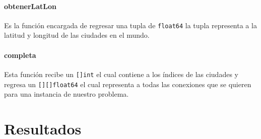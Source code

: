 \documentclass[
10pt,
a4paper,
oneside,
headinclude,footinclude,
BCOR5mm,
]{article}
\begin{document}
\paragraph{obtenerLatLon} Es la función encargada de regresar una tupla de
\texttt{float64} la tupla representa a la latitud y longitud de las ciudades en
el mundo.

\paragraph{completa} Esta función recibe un \texttt{[]int} el cual contiene a los
índices de las ciudades y regresa un \texttt{[][]float64} el cual representa a
todas las conexiones que se quieren para una instancia de nuestro problema.

\section{Resultados}


{}

\end{document}
